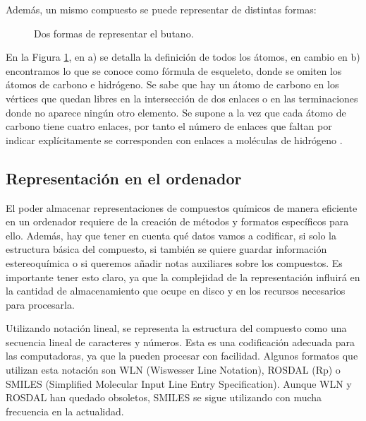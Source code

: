 Además, un mismo compuesto se puede representar de distintas formas:
\begin{figure}[H]
\centering
    \caption{Dos formas de representar el butano. \cite{structrep}}
    \label{fig:butano}
\end{figure}

En la Figura \ref{fig:butano}, en a) se detalla la definición de todos los átomos, en cambio en b) encontramos lo que se conoce como fórmula de esqueleto, donde se omiten los átomos de carbono e hidrógeno. Se sabe que hay un átomo de carbono en los vértices que quedan libres en la intersección de dos enlaces o en las terminaciones donde no aparece ningún otro elemento. Se supone a la vez que cada átomo de carbono tiene cuatro enlaces, por tanto el número de enlaces que faltan por indicar explícitamente se corresponden con enlaces a moléculas de hidrógeno \cite{wade2004quimica,structrep}.


\subsection{Representación en el ordenador}
El poder almacenar representaciones de compuestos químicos de manera eficiente en un ordenador requiere de la creación de métodos y formatos específicos para ello. Además, hay que tener en cuenta qué datos vamos a codificar, si solo la estructura básica del compuesto, si también se quiere guardar información estereoquímica o si queremos añadir notas auxiliares sobre los compuestos. Es importante tener esto claro, ya que la complejidad de la representación influirá en la cantidad de almacenamiento que ocupe en disco y en los recursos necesarios para procesarla.

Utilizando notación lineal, se representa la estructura del compuesto como una secuencia lineal de caracteres y números. Esta es una codificación adecuada para las computadoras, ya que la pueden procesar con facilidad. Algunos formatos que utilizan esta notación son WLN (Wiswesser Line Notation), ROSDAL (Rp) o SMILES (Simplified Molecular Input Line Entry Specification). Aunque WLN y ROSDAL han quedado obsoletos, SMILES se sigue utilizando con mucha frecuencia en la actualidad. \cite{doi:10.1021/ci600234z}


